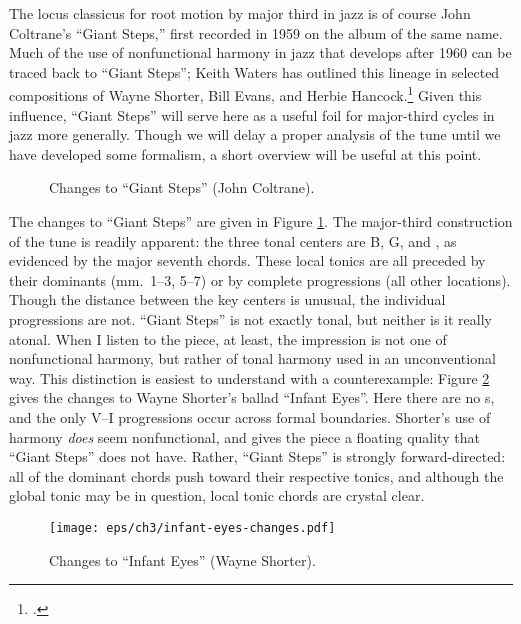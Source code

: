 The locus classicus for root motion by major third in jazz is of course John
Coltrane's ``Giant Steps,'' first recorded in 1959 on the album of the same
name. Much of the use of nonfunctional harmony in jazz that
develops after 1960 can be traced back to ``Giant Steps''; Keith Waters has
outlined this lineage in selected compositions of Wayne Shorter, Bill Evans,
and Herbie Hancock.\footcite{waters:2010} Given this influence, ``Giant
Steps'' will serve here as a useful foil for major-third cycles in jazz more
generally. Though we will delay a proper analysis of the tune until we have
developed some formalism, a short overview will be useful at this point.

\begin{figure}[tbp]
  \caption{Changes to ``Giant Steps'' (John Coltrane).}
  \label{maj3:giant-steps-changes}
\end{figure}

The changes to ``Giant Steps'' are given in Figure
\ref{maj3:giant-steps-changes}. The major-third construction of the tune is
readily apparent: the three tonal centers are B, G, and \Eflat, as evidenced
by the major seventh chords. These local tonics are all preceded by their
dominants (mm.~1--3, 5--7) or by complete \tf progressions (all other
locations). Though the distance between the key centers is unusual, the
individual progressions are not. ``Giant Steps'' is not exactly
tonal, but neither is it really atonal. When I listen to the piece, at least,
the impression is not one of nonfunctional harmony, but rather of
tonal harmony used in an unconventional way. This distinction is easiest to understand
with a counterexample: Figure \ref{maj3:infant-eyes-changes} gives the changes to
Wayne Shorter's ballad ``Infant Eyes''. Here there are no \tf{}s,
and the only V--I progressions occur across formal boundaries. Shorter's use
of harmony \emph{does} seem nonfunctional, and gives the piece a floating
quality that ``Giant Steps'' does not have. Rather, ``Giant Steps'' is
strongly forward-directed: all of the dominant chords push toward their
respective tonics, and although the global tonic may be in question, local
tonic chords are crystal clear.

\begin{figure}[tbp]
  \hspace{6em}\texttt{[image: eps/ch3/infant-eyes-changes.pdf]}
  \caption{Changes to ``Infant Eyes'' (Wayne Shorter).}
  \label{maj3:infant-eyes-changes}
\end{figure}

